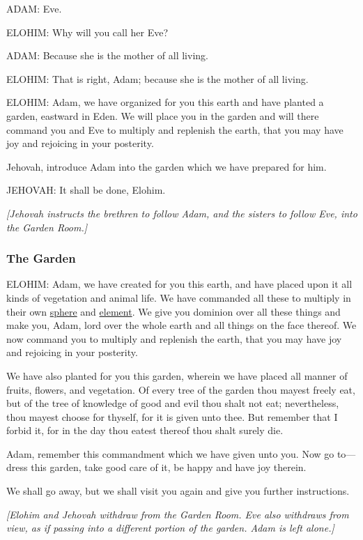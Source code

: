 				ADAM: Eve.

				ELOHIM: Why will you call her Eve?

				ADAM: Because she is the mother of all living.

				ELOHIM: That is right, Adam; because she is the mother of all living.
				
				ELOHIM: Adam, we have organized for you this earth and have planted a garden, eastward in Eden. We will place you in the garden and will there command you and Eve to multiply and replenish the earth, that you may have joy and rejoicing in your posterity.

				Jehovah, introduce Adam into the garden which we have prepared for him.

				JEHOVAH: It shall be done, Elohim.

				\textit{[Jehovah instructs the brethren to follow Adam, and the sisters to follow Eve, into the Garden Room.]}
				
		\subsubsection{The Garden}
			\label{TEMPLE-ENDOWMENT-ENDOW-PRE-1990-GARDEN}
		
			ELOHIM: Adam, we have created for you this earth, and have placed upon it all kinds of vegetation and animal life. We have commanded all these to multiply in their own \hyperref[SPHERE-1828]{sphere} and \hyperref[ELEMENT-1828]{element}. We give you dominion over all these things and make you, Adam, lord over the whole earth and all things on the face thereof. We now command you to multiply and replenish the earth, that you may have joy and rejoicing in your posterity.

			We have also planted for you this garden, wherein we have placed all manner of fruits, flowers, and vegetation. Of every tree of the garden thou mayest freely eat, but of the tree of knowledge of good and evil thou shalt not eat; nevertheless, thou mayest choose for thyself, for it is given unto thee. But remember that I forbid it, for in the day thou eatest thereof thou shalt surely
			die.

			Adam, remember this commandment which we have given unto you. Now go to---dress this garden, take good care of it, be happy and have joy therein.

			We shall go away, but we shall visit you again and give you further instructions.

			\textit{[Elohim and Jehovah withdraw from the Garden Room. Eve also withdraws from view, as if passing into a different portion of the garden. Adam is left alone.]}
			

